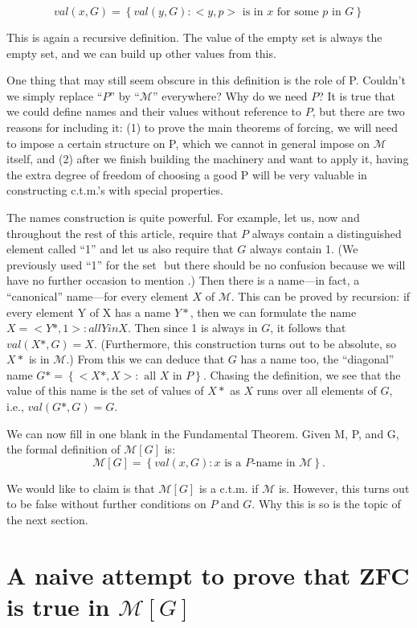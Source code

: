 \documentclass[10pt]{article}
\newcommand\axiom[1]{\textmd{#1}}
\begin{document}
$$val(x,G) =\left\{val(y,G) : <y,p>\text{ is in }x\text{ for some }p\text{ in }G\right\}$$

This is again a recursive definition. The value of the empty set is always the empty set, and we can build up other values from this.

One thing that may still seem obscure in this definition is the role of P. Couldn't we simply replace ``$P$'' by ``$\mathcal M$'' everywhere? Why do we need $P$? It is true that we could define names and their values without reference to $P$, but there are two reasons for including it: (1) to prove the main theorems of forcing, we will need to impose a certain structure on P, which we cannot in general impose on $\mathcal{M}$ itself, and (2) after we finish building the machinery and want to apply it, having the extra degree of freedom of choosing a good P will be very valuable in constructing c.t.m.'s with special properties.

The names construction is quite powerful. For example, let us, now and throughout the rest of this article, require that $P$ always contain a distinguished element called ``1'' and let us also require that $G$ always contain 1. (We previously used ``1'' for the set ${{}}$ but there should be no confusion because we will have no further occasion to mention ${{}}$.) Then there is a name---in fact, a ``canonical'' name---for every element $X$ of $\mathcal M$. This can be proved by recursion: if every element Y of X has a name $Y*$, then we can formulate the name $X = {<Y*,1> : all Y in X}$. Then since 1 is always in $G$, it follows that $val(X*,G) = X$. (Furthermore, this construction turns out to be absolute, so $X*$ is in $\mathcal M$.) From this we can deduce that $G$ has a name too, the ``diagonal'' name $G* = \left\{<X*,X> :\text{ all }X\text{ in }P\right\}$. Chasing the definition, we see that the value of this name is the set of values of $X*$ as $X$ runs over all elements of $G$, i.e., $val(G*,G) = G$.

We can now fill in one blank in the Fundamental Theorem. Given M, P, and G, the formal definition of $\mathcal{M}[G]$ is: 
 $$\mathcal{M}[G] = \left\{val(x,G) : x\text{ is a }P\text{-name in }\mathcal M\right\}.$$

We would like to claim is that $\mathcal{M}[G]$ is a c.t.m. if $\mathcal{M}$ is. However, this turns out to be false without further conditions on $P$ and $G$. Why this is so is the topic of the next section.


\section{A naive attempt to prove that \axiom{ZFC} is true in $\mathcal{M}[G]$}
\end{document}
